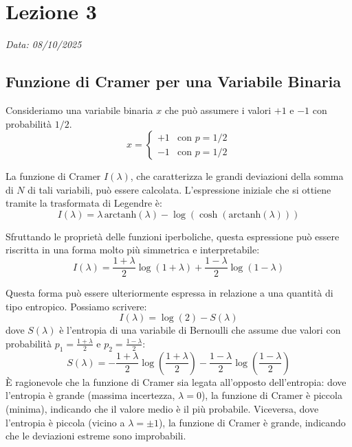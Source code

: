\chapter{Lezione 3}
\label{chap:lezione_03} 

\begin{flushright}
\textit{Data: 08/10/2025}
\end{flushright}


\section{Funzione di Cramer per una Variabile Binaria}

Consideriamo una variabile binaria $x$ che può assumere i valori $+1$ e $-1$ con probabilità $1/2$.
\begin{equation}
x = \begin{cases}
+1 & \text{con } p = 1/2 \\
-1 & \text{con } p = 1/2
\end{cases}
\end{equation}

La funzione di Cramer $I(\lambda)$, che caratterizza le grandi deviazioni della somma di $N$ di tali variabili, può essere calcolata. L'espressione iniziale che si ottiene tramite la trasformata di Legendre è:
\begin{equation}
I(\lambda) = \lambda \, \text{arctanh}(\lambda) - \log(\cosh(\text{arctanh}(\lambda)))
\end{equation}

Sfruttando le proprietà delle funzioni iperboliche, questa espressione può essere riscritta in una forma molto più simmetrica e interpretabile:
\begin{equation}
I(\lambda) = \frac{1+\lambda}{2} \log(1+\lambda) + \frac{1-\lambda}{2} \log(1-\lambda)
\end{equation}

Questa forma può essere ulteriormente espressa in relazione a una quantità di tipo entropico. Possiamo scrivere:
\begin{equation}
I(\lambda) = \log(2) - S(\lambda)
\end{equation}
dove $S(\lambda)$ è l'entropia di una variabile di Bernoulli che assume due valori con probabilità $p_1 = \frac{1+\lambda}{2}$ e $p_2 = \frac{1-\lambda}{2}$:
\begin{equation}
S(\lambda) = -\frac{1+\lambda}{2} \log\left(\frac{1+\lambda}{2}\right) - \frac{1-\lambda}{2} \log\left(\frac{1-\lambda}{2}\right)
\end{equation}
È ragionevole che la funzione di Cramer sia legata all'opposto dell'entropia: dove l'entropia è grande (massima incertezza, $\lambda=0$), la funzione di Cramer è piccola (minima), indicando che il valore medio è il più probabile. Viceversa, dove l'entropia è piccola (vicino a $\lambda = \pm 1$), la funzione di Cramer è grande, indicando che le deviazioni estreme sono improbabili.

